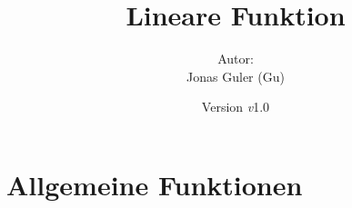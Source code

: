 \documentclass[11pt,oneside]{article}
\newcommand{\Skriptname}{Lineare Funktion}
\newcommand{\Autor}{Jonas Guler (Gu)}
\newcommand{\version}{\textit{v}1.0}
\begin{document}
\begin{titlepage}
	\clearpage
	\title{\Huge\textbf{\Skriptname} \\[1cm]}
	\author{Autor:\\ \Autor}
	\date{\normalsize {Version \version}\\ \datelong}
	\maketitle
    \thispagestyle{empty}
    \vfill
    \tableofcontents
\end{titlepage}
\section{Allgemeine Funktionen}
\end{document}
